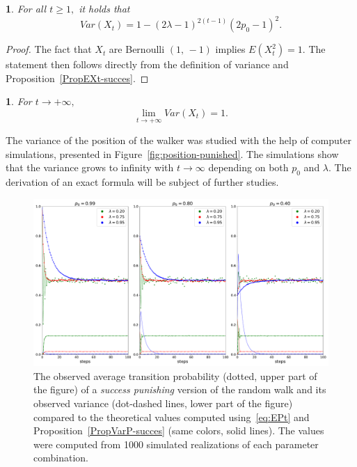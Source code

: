 \documentclass{amsart}
\theoremstyle{definition}
\theoremstyle{plain}
\newtheorem{prop}[thm]{\protect\propositionname}
\theoremstyle{plain}
\newtheorem{cor}[thm]{\protect\corollaryname}
\theoremstyle{plain}
\numberwithin{equation}{section}
\providecommand{\corollaryname}{Corollary}
\providecommand{\propositionname}{Proposition}
\begin{document}
    \begin{prop}
        \label{propVarX}
        For all $t\geq1,$ it holds that
        \begin{equation}
            Var(X_{t})=1-(2\lambda-1)^{2(t-1)}(2p_{0}-1)^2.
        \end{equation}
    \end{prop}
    \begin{proof}
        The fact that $X_t$ are Bernoulli $(1,\,-1)$ implies $E(X_{t}^2)=1$.
        The statement then follows directly from the definition of variance and Proposition~\ref{PropEXt-succes}.
    \end{proof}


    \begin{cor}
        For $t\rightarrow+\infty,$ \textup{
            \begin{equation}
                \lim_{t\to+\infty}Var(X_{t})=1.
            \end{equation}
        }
    \end{cor}

    The variance of the position of the walker was studied with the help of computer simulations, presented in Figure~\ref{fig:position-punished}.
    The simulations show that the variance grows to infinity with $t\rightarrow\infty$ depending on both $p_0$ and $\lambda$.
    The derivation of an exact formula will be subject of further studies.

    \begin{figure}
        \begin{center}
            \includegraphics[width=1\textwidth]{../simulations/e_probability_1000_walks_100_steps_type_success_punished}
            \caption{\label{fig:The-development-punished}The observed
            average transition probability (dotted, upper part of the figure)
                of a \emph{success punishing} version of the random walk and its observed
                variance (dot-dashed lines, lower part of the figure) compared to
                the theoretical values computed using~\eqref{eq:EPt} and Proposition~\ref{PropVarP-succes} (same colors, solid lines).
                The values were
                computed from 1000 simulated realizations of each parameter combination.}
        \end{center}
    \end{figure}
\end{document}
